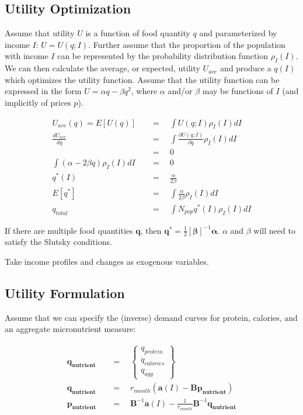 \documentclass[letter,12pt]{article}
\begin{document}
\subsection{Utility Optimization}

Assume that utility $U$ is a function of food quantity $q$ and parameterized by income $I$: $U = U\left(q;I\right)$.  Further assume that the proportion of the population with income $I$ can be represented by the probability distribution function $\rho_I \left(I\right)$.  We can then calculate the average, or expected, utility $U_{ave}$ and produce a $q\left(I\right)$ which optimizes the utility function.  Assume that the utility function can be expressed in the form $U = \alpha q - \beta q^2$, where $\alpha$ and/or $\beta$ may be functions of $I$ (and implicitly of prices $p$).

\begin{align}
U_{ave} \left(q\right) = E\left[U\left(q\right)\right] \quad &= \quad  \int U \left(q;I\right) \rho_I \left(I\right) dI \\
\frac{d U_{ave}}{dq} \quad &= \quad  \int \frac{\partial U \left(q;I\right)}{\partial q} \rho_I \left(I\right) dI\\
 \quad &= \quad  0 \\
\int  \left(\alpha - 2 \beta q\right) \rho_I \left(I\right) dI \quad &= \quad  0 \\
q^*\left(I\right) \quad &= \quad  \frac{\alpha}{2 \beta} \\
E\left[q^*\right] \quad &= \quad  \int  \frac{\alpha}{2 \beta} \rho_I \left(I\right) dI \\
q_{total} \quad &= \quad  \int N_{pop} q^* \left(I\right) \rho_I \left(I\right) dI
\end{align}

If there are multiple food quantities $\mathbf{q}$, then $\mathbf{q}^* = \frac{1}{2} \left[\boldsymbol \beta\right]^{-1} \boldsymbol \alpha$.  $\alpha$ and $\beta$ will need to satisfy the Slutsky conditions.

Take income profiles and changes as exogenous variables.

\subsection{Utility Formulation}

Assume that we can specify the (inverse) demand curves for protein, calories, and an aggregate micronutrient measure:

\begin{align}
\mathbf{q_{nutrient}} \quad &= \quad  \left\{ \begin{array}{c}
q_{protein} \\
q_{calories} \\
q_{agg}
\end{array} \right\} \\
\mathbf{q_{nutrient}} \quad &= \quad  r_{month} \left(\mathbf{a}\left(I\right) - \mathbf{B} \mathbf{p_{nutrient}}\right) \\
\mathbf{p_{nutrient}} \quad &= \quad  \mathbf{B}^{-1} \mathbf{a} \left(I\right) - \frac{1}{r_{month}} \mathbf{B}^{-1} \mathbf{q_{nutrient}}
\end{align}
\end{document}
